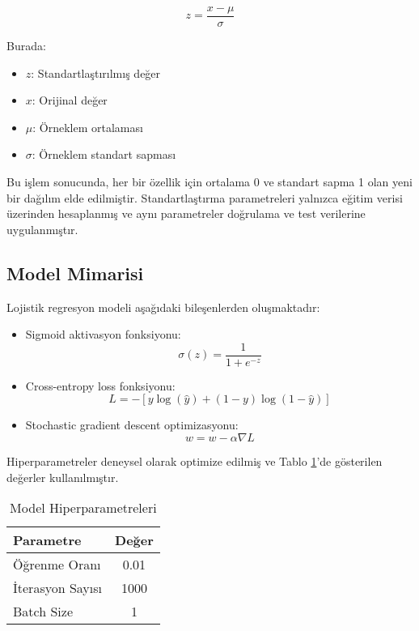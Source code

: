 \documentclass[conference]{IEEEtran}
\begin{document}
\begin{equation}
z = \frac{x - \mu}{\sigma}
\end{equation}

Burada:
\begin{itemize}
\item $z$: Standartlaştırılmış değer
\item $x$: Orijinal değer
\item $\mu$: Örneklem ortalaması
\item $\sigma$: Örneklem standart sapması
\end{itemize}

Bu işlem sonucunda, her bir özellik için ortalama 0 ve standart sapma 1 olan
yeni bir dağılım elde edilmiştir. Standartlaştırma parametreleri yalnızca
eğitim verisi üzerinden hesaplanmış ve aynı parametreler doğrulama ve test
verilerine uygulanmıştır.

\subsection{Model Mimarisi}
Lojistik regresyon modeli aşağıdaki bileşenlerden oluşmaktadır:
\begin{itemize}
\item Sigmoid aktivasyon fonksiyonu: 
\begin{equation}
\sigma(z) = \frac{1}{1 + e^{-z}}
\end{equation}
\item Cross-entropy loss fonksiyonu:
\begin{equation}
L = -[y\log(\hat{y}) + (1-y)\log(1-\hat{y})]
\end{equation}
\item Stochastic gradient descent optimizasyonu:
\begin{equation}
w = w - \alpha\nabla L
\end{equation}
\end{itemize}

Hiperparametreler deneysel olarak optimize edilmiş ve Tablo
\ref{tab:hyperparameters}'de gösterilen değerler kullanılmıştır.

\begin{table}[!t]
\caption{Model Hiperparametreleri}
\label{tab:hyperparameters}
\centering
\begin{tabular}{|l|c|}
\hline
\textbf{Parametre} & \textbf{Değer} \\
\hline
Öğrenme Oranı & 0.01 \\
İterasyon Sayısı & 1000 \\
Batch Size & 1 \\
\hline
\end{tabular}
\end{table}
\end{document}
